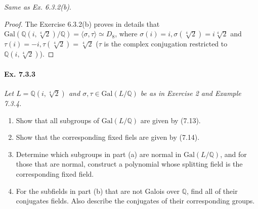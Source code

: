 \documentclass[11pt,a4paper]{article}
\newcommand{\be} {\begin{enumerate}}
\newcommand{\ee} {\end{enumerate}}
\newcommand{\Q}{\mathbb{Q}}
\newcommand{\Gal}{\mathrm{Gal}}
\begin{document}
{\it Same as Ex. 6.3.2(b)}.

\begin{proof}
The Exercise 6.3.2(b) proves in details that $\Gal(\Q(i,\sqrt[4]{2})/\Q) = \langle \sigma, \tau\rangle \simeq D_8$, where $\sigma(i) = i, \sigma(\sqrt[4]{2}) = i \sqrt[4]{2}$ and $\tau(i) = -i, \tau(\sqrt[4]{2}) = \sqrt[4]{2}$ ($\tau$ is the complex conjugation restricted to $\Q(i,\sqrt[4]{2})$).
\end{proof}

\paragraph{Ex. 7.3.3}

{\it Let $L = \Q(i,\sqrt[4]{2})$ and $\sigma, \tau \in \Gal(L/\Q)$ be as in Exercise 2 and Example 7.3.4.
\be
\item[(a)] Show that all subgroups of $\Gal(L/\Q)$ are given by (7.13).
\item[(b)] Show that the corresponding fixed fiels are given by (7.14).
\item[(c)] Determine which subgroups in part (a) are normal in $\Gal(L/\Q)$, and for those that are normal, construct a polynomial whose splitting field is the corresponding fixed field.
\item[(d)] For the subfields in part (b) that are not Galois over $\Q$, find all of their conjugates fields. Also describe the conjugates of their corresponding groups.
\ee
}
\end{document}
